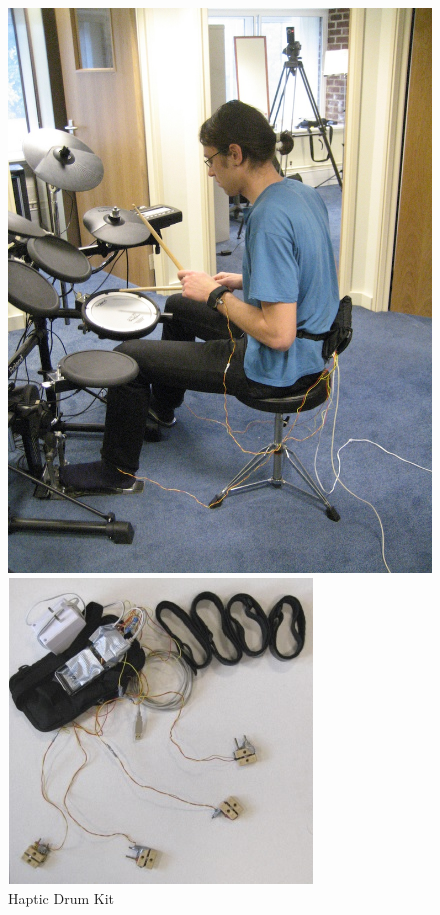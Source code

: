\documentclass[ngerman,runningheads,a4paper]{llncs}
\begin{document}
\begin{figure}
  \begin{minipage}[b]{0.4\textwidth}
    \includegraphics[width = \textwidth]{pictures/hapticdrumkit}
    \caption{Haptic Drum Kit \cite{10.1145/1709886.1709892}}
  \end{minipage}
  \hspace{0.1\textwidth}
  \begin{minipage}[b]{0.4\textwidth}
    \includegraphics[width = \textwidth]{pictures/hapticdrumkit1}

\end{minipage}
\end{figure}
\end{document}
